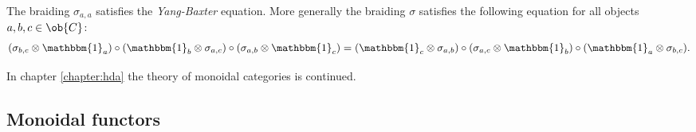     \begin{property}
        The braiding $\sigma_{a,a}$ satisfies the \textit{Yang-Baxter} equation. More generally the braiding $\sigma$ satisfies the following equation for all objects $a,b,c\in\ob{C}$:
        \begin{gather}
            (\sigma_{b,c}\otimes\mathbbm{1}_a)\circ(\mathbbm{1}_b\otimes\sigma_{a,c})\circ(\sigma_{a,b}\otimes\mathbbm{1}_c) = (\mathbbm{1}_c\otimes\sigma_{a,b})\circ(\sigma_{a,c}\otimes\mathbbm{1}_b)\circ(\mathbbm{1}_a\otimes\sigma_{b,c}).
        \end{gather}
    \end{property}


    In chapter \ref{chapter:hda} the theory of monoidal categories is continued.

\subsection{Monoidal functors}

